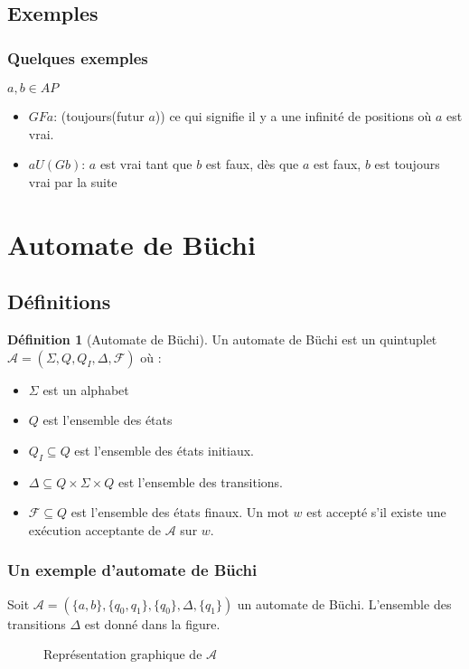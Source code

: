 \documentclass{beamer}
\theoremstyle{plain}
\theoremstyle{definition}
\newtheorem{defi}{Définition}
\begin{document}
\subsection{Exemples}
\begin{frame}
  \frametitle{Quelques exemples}

  $a, b \in AP$
  \begin{itemize}
  \item $GFa$: (toujours(futur $a$)) ce qui signifie il y a une infinité de positions où $a$ est vrai.
    \pause
  \item $aU(Gb)$: $a$ est vrai tant que $b$ est faux, dès que $a$ est faux, $b$ est toujours vrai par la suite
  \end{itemize}
\end{frame}


\section{Automate de Büchi}
\subsection{Définitions}
\begin{frame}
  \begin{defi}[Automate de Büchi]
    Un automate de Büchi est un quintuplet $\mathcal{A}=(\Sigma, Q, Q_I, \Delta, \mathscr{F})$ où :
    \begin{itemize}
    \item $\Sigma$ est un alphabet
    \item $Q$ est l'ensemble des états
    \item $Q_I \subseteq Q$ est l'ensemble des états initiaux.
    \item $\Delta \subseteq Q \times \Sigma \times Q$ est l'ensemble des transitions.
    \item $\mathscr{F} \subseteq Q$ est l'ensemble des états finaux.
      Un mot $w$ est accepté s'il existe une exécution acceptante de $\mathcal{A}$ sur $w$.
    \end{itemize}
  \end{defi}
\end{frame}

\begin{frame}
  \frametitle{Un exemple d'automate de Büchi}

  Soit $\mathcal{A}=(\{a,b\}, \{q_0, q_1\}, \{q_0\}, \Delta, \{q_1\})$ un automate de Büchi.
  L'ensemble des transitions $\Delta$ est donné dans la figure.
  \begin{figure}
    \centering
    \caption{Représentation graphique de $\mathcal{A}$}
  \end{figure}
\end{frame}
\end{document}
